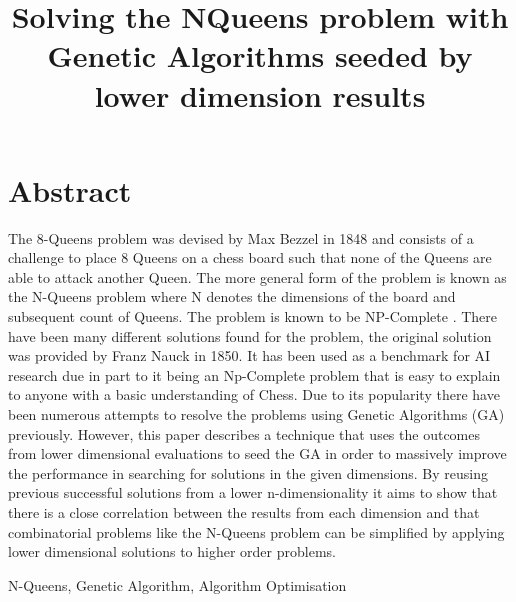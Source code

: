 \documentclass[conference]{IEEEtran}
\begin{document}
\title{\vspace{-2.5cm}Solving the NQueens problem with Genetic Algorithms seeded by lower dimension results}
\author{
}

\maketitle


\section{Abstract}
The 8-Queens problem was devised by Max Bezzel in 1848 and consists of a challenge to place 8 Queens on a chess board such that none of the Queens are able to attack another Queen. The more general form of the problem is known as the N-Queens problem where N denotes the dimensions of the board and subsequent count of Queens. The problem is known to be NP-Complete \cite{Complexity}. There have been many different solutions found for the problem, the original solution was provided by Franz Nauck in 1850. It has been used as a benchmark for AI research due in part to it being an Np-Complete problem that is easy to explain to anyone with a basic understanding of Chess. Due to its popularity there have been numerous attempts to resolve the problems using Genetic Algorithms (GA) previously. However, this paper describes a technique that uses the outcomes from lower dimensional evaluations to seed the GA in order to massively improve the performance in searching for solutions in the given dimensions. By reusing previous successful solutions from a lower n-dimensionality it aims to show that there is a close correlation between the results from each dimension and that combinatorial problems like the N-Queens problem can be simplified by applying lower dimensional solutions to higher order problems.

\begin{IEEEkeywords}
	N-Queens, Genetic Algorithm, Algorithm Optimisation
\end{IEEEkeywords}
\end{document}
